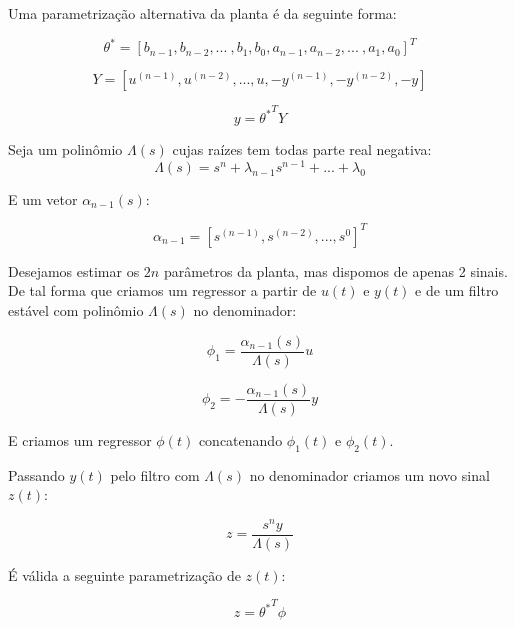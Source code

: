 \documentclass[aspectratio=169]{beamer}
\begin{document}
\begin{frame}
Uma parametrização alternativa da planta é da seguinte forma:

\begin{equation*}
\theta^* = [b_{n-1}, b_{n-2}, ...~ , b_1, b_0, a_{n-1}, a_{n-2}, ...~ , a_1, a_0]^T
\end{equation*}

\begin{equation*}
Y = [u^{(n-1)},u^{(n-2)},...,u,-y^{(n-1)},-y^{(n-2)},-y]
\end{equation*}


\begin{equation*}
y = {\theta^*}^T Y
\end{equation*}


\end{frame}


\begin{frame}

Seja um polinômio $\Lambda(s)$ cujas raízes tem todas parte real negativa:
\begin{equation*}
\Lambda(s) = s^n + \lambda_{n-1} s^{n-1} + ... + \lambda_0
\end{equation*}

E um vetor $\alpha_{n-1}(s)$:

\begin{equation*}
\alpha_{n-1} = [s^{(n-1)},s^{(n-2)},...,s^0]^T
\end{equation*}

\end{frame}

\begin{frame}

Desejamos estimar os $2n$ parâmetros da planta, mas dispomos de apenas 2 sinais. De tal forma que criamos um regressor a partir de $u(t)$ e $y(t)$ e de um filtro estável com polinômio $\Lambda(s)$ no denominador:

\begin{equation*}
\phi_1 = \frac{\alpha_{n-1}(s)}{\Lambda(s)} u
\end{equation*}

\begin{equation*}
\phi_2 = -\frac{\alpha_{n-1}(s)}{\Lambda(s)} y
\end{equation*}

E criamos um regressor $\phi(t)$ concatenando $\phi_1(t)$ e $\phi_2(t)$.
\end{frame}


\begin{frame}

Passando $y(t)$ pelo filtro com $\Lambda(s)$ no denominador criamos um novo sinal $z(t)$:

\begin{equation*}
z = \frac{s^n y}{\Lambda(s)}
\end{equation*}

É válida a seguinte parametrização de $z(t)$:

\begin{equation*}
z = {\theta^*}^T \phi
\end{equation*}


\end{frame}
\end{document}
